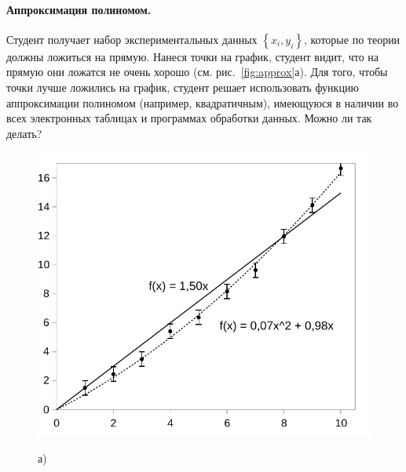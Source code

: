 \paragraph{Аппроксимация полиномом.}

Студент получает набор экспериментальных данных $\left\{ x_{i},y_{i}\right\} $,
которые по теории должны ложиться на прямую. Нанеся точки на график,
студент видит, что на прямую они ложатся не очень хорошо (см. рис.~\ref{fig:approx}а).
Для того, чтобы точки лучше ложились на график, студент решает использовать
функцию аппроксимации полиномом (например, квадратичным), имеющуюся
в наличии во всех электронных таблицах и программах обработки данных.
Можно ли так делать?

\begin{figure}[h]
\begin{minipage}[t]{0.49\columnwidth}%
\begin{center}
\includegraphics[width=1\linewidth]{images/x2.pdf}
\par\end{center}
\begin{center}
а)
\par\end{center}%
\end{minipage}%
\begin{minipage}[t]{0.49\columnwidth}%
\begin{center}

\end{center}
\end{minipage}
\end{figure}
